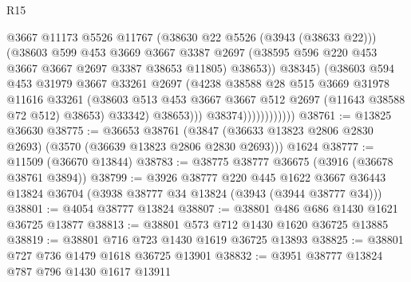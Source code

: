 \begin{lexlean}{R15}
\begin{coremodule}
                                    @3667
                                    @11173
                                    @5526
                                    @11767
                                    (@38630 @22 @5526 (@3943 (@38633 @22)))
                                    (@38603
                                      @599
                                      @453
                                      @3669
                                      @3667
                                      @3387
                                      @2697
                                      (@38595 @596 @220 @453 @3667 @3667 @2697 @3387 @38653 @11805)
                                      @38653))
                                  @38345)
                                (@38603
                                  @594
                                  @453
                                  @31979
                                  @3667
                                  @33261
                                  @2697
                                  (@4238
                                    @38588
                                    @28
                                    @515
                                    @3669
                                    @31978
                                    @11616
                                    @33261
                                    (@38603
                                      @513
                                      @453
                                      @3667
                                      @3667
                                      @512
                                      @2697
                                      (@11643 @38588 @72 @512)
                                      @38653)
                                    @33342)
                                  @38653)))
                            @38374))))))))))))
@38761 := @13825 @36630
@38775 := @36653
    @38761
    (@3847 (@36633 @13823 @2806 @2830 @2693) (@3570 (@36639 @13823 @2806 @2830 @2693)))
    @1624
@38777 := @11509 (@36670 @13844)
@38783 := @38775 @38777 @36675 (@3916 (@36678 @38761 @3894))
@38799 := @3926
    @38777
    @220
    @445
    @1622
    @3667
    @36443
    @13824
    @36704
    (@3938 @38777 @34 @13824 (@3943 (@3944 @38777 @34)))
@38801 := @4054 @38777 @13824
@38807 := @38801 @486 @686 @1430 @1621 @36725 @13877
@38813 := @38801 @573 @712 @1430 @1620 @36725 @13885
@38819 := @38801 @716 @723 @1430 @1619 @36725 @13893
@38825 := @38801 @727 @736 @1479 @1618 @36725 @13901
@38832 := @3951 @38777 @13824 @787 @796 @1430 @1617 @13911

\end{coremodule}
\end{lexlean}

